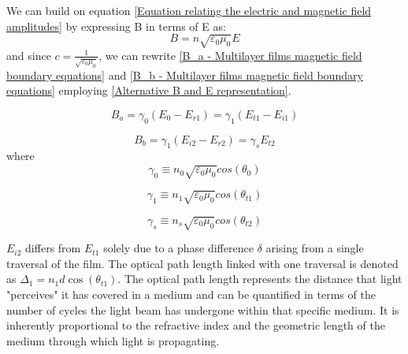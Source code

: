 We can build on equation \ref{Equation relating the electric and magnetic field amplitudes} by expressing B in terms of E as:
    \begin{equation} \label{Alternative B and E representation}
    B = n\sqrt{\varepsilon_0\mu_0}E
    \end{equation}
and since $c=\frac{1}{\sqrt{\varepsilon_0\mu_0}}$, we can rewrite \ref{B_a - Multilayer films magnetic field boundary equations} and \ref{B_b - Multilayer films magnetic field boundary equations} employing \ref{Alternative B and E representation}.

    \begin{equation} \label{Alternative B_a - Multilayer films magnetic field boundary equations}
    B_a = \gamma_0(E_0 - E_{r1}) = \gamma_1(E_{t1} - E_{i1})
    \end{equation}

    \begin{equation} \label{Alternative B_b - Multilayer films magnetic field boundary equations}
    B_b = \gamma_1(E_{i2} - E_{r2}) = \gamma_sE_{t2}
    \end{equation}
where
    \begin{equation} \label{gamma 0}
        \gamma_0 \equiv n_0 \sqrt{\varepsilon_0\mu_0} cos(\theta_0)
    \end{equation}

    \begin{equation} \label{gamma 1}
        \gamma_1 \equiv n_1 \sqrt{\varepsilon_0\mu_0} cos(\theta_{t1})
    \end{equation}

    \begin{equation} \label{gamma s}
        \gamma_s \equiv n_s \sqrt{\varepsilon_0\mu_0} cos(\theta_{t2})
    \end{equation}

$E_{i2}$ differs from $E_{t1}$ solely due to a phase difference $\delta$ arising from a single traversal of the film. The optical path length linked with one traversal is denoted as $\Delta_1=n_1d\cos(\theta_{t1})$. The optical path length represents the distance that light "perceives" it has covered in a medium and can be quantified in terms of the number of cycles the light beam has undergone within that specific medium. It is inherently proportional to the refractive index and the geometric length of the medium through which light is propagating. %

